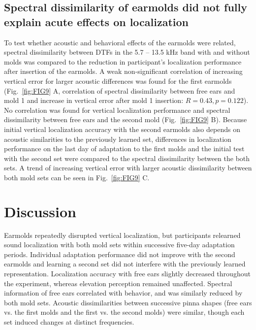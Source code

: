 \documentclass[preprint]{JASA}
\begin{document}
\subsection{Spectral dissimilarity of earmolds did not fully explain acute effects on localization}
To test whether acoustic and behavioral effects of the earmolds were related, spectral dissimilarity between DTFs in the 5.7 – 13.5 kHz band with and without molds was compared to the reduction in participant’s localization performance after insertion of the earmolds. A weak non-significant correlation of increasing vertical error for larger acoustic differences was found for the first earmolds (Fig.~\ref{fig:FIG9} A, correlation of spectral dissimilarity between free ears and mold 1 and increase in vertical error after mold 1 insertion: $R = 0.43, p = 0.122$). No correlation was found for vertical localization performance and spectral dissimilarity between free ears and the second mold (Fig.~\ref{fig:FIG9} B). Because initial vertical localization accuracy with the second earmolds also depends on acoustic similarities to the previously learned set, differences in localization performance on the last day of adaptation to the first molds and the initial test with the second set were compared to the spectral dissimilarity between the both sets. A trend of increasing vertical error with larger acoustic dissimilarity between both mold sets can be seen in Fig.~\ref{fig:FIG9} C.

\section{\label{sec:4} Discussion}
Earmolds repeatedly disrupted vertical localization, but participants relearned sound localization with both mold sets within successive five-day adaptation periods. Individual adaptation performance did not improve with the second earmolds and learning a second set did not interfere with the previously learned representation. Localization accuracy with free ears slightly decreased throughout the experiment, whereas elevation perception remained unaffected. Spectral information of free ears correlated with behavior, and was similarly reduced by both mold sets. Acoustic dissimilarities between successive pinna shapes (free ears vs. the first molds and the first vs. the second molds) were similar, though each set induced changes at distinct frequencies.
\end{document}
